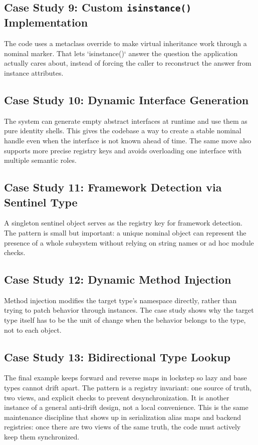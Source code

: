 \subsection{Case Study 9: Custom \texttt{isinstance()} Implementation}
The code uses a metaclass override to make virtual inheritance work through a nominal marker. That lets `isinstance()` answer the question the application actually cares about, instead of forcing the caller to reconstruct the answer from instance attributes.

\subsection{Case Study 10: Dynamic Interface Generation}
The system can generate empty abstract interfaces at runtime and use them as pure identity shells. This gives the codebase a way to create a stable nominal handle even when the interface is not known ahead of time. The same move also supports more precise registry keys and avoids overloading one interface with multiple semantic roles.

\subsection{Case Study 11: Framework Detection via Sentinel Type}
A singleton sentinel object serves as the registry key for framework detection. The pattern is small but important: a unique nominal object can represent the presence of a whole subsystem without relying on string names or ad hoc module checks.

\subsection{Case Study 12: Dynamic Method Injection}
Method injection modifies the target type's namespace directly, rather than trying to patch behavior through instances. The case study shows why the target type itself has to be the unit of change when the behavior belongs to the type, not to each object.

\subsection{Case Study 13: Bidirectional Type Lookup}
The final example keeps forward and reverse maps in lockstep so lazy and base types cannot drift apart. The pattern is a registry invariant: one source of truth, two views, and explicit checks to prevent desynchronization. It is another instance of a general anti-drift design, not a local convenience. This is the same maintenance discipline that shows up in serialization alias maps and backend registries: once there are two views of the same truth, the code must actively keep them synchronized.

